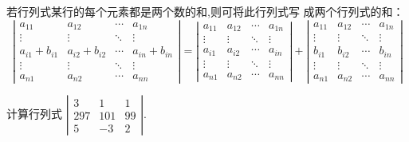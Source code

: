 \begin{property}
    若行列式某行的每个元素都是两个数的和,则可将此行列式写
    成两个行列式的和：
    \small
    $$\left|\begin{array}{ccccc}
            a_{11}        & a_{12}        & \cdots & a_{1n}        \\
            \vdots        & \vdots        & \ddots & \vdots        \\
            a_{i1}+b_{i1} & a_{i2}+b_{i2} & \cdots & a_{in}+b_{in} \\
            \vdots        & \vdots        & \ddots & \vdots        \\
            a_{n1}        & a_{n2}        & \cdots & a_{nn}
        \end{array}\right|   =   \left|\begin{array}{ccccc}
            a_{11} & a_{12} & \cdots & a_{1n} \\
            \vdots & \vdots & \ddots & \vdots \\
            a_{i1} & a_{i2} & \cdots & a_{in} \\
            \vdots & \vdots & \ddots & \vdots \\
            a_{n1} & a_{n2} & \cdots & a_{nn}
        \end{array}\right| +\left|\begin{array}{ccccc}
            a_{11} & a_{12} & \cdots & a_{1n} \\
            \vdots & \vdots & \ddots & \vdots \\
            b_{i1} & b_{i2} & \cdots & b_{in} \\
            \vdots & \vdots & \ddots & \vdots \\
            a_{n1} & a_{n2} & \cdots & a_{nn}
        \end{array}\right|   $$
\end{property}

\begin{example}
    计算行列式
    $ \left|\begin{array}{cccc}
            3   & 1   & 1  \\
            297 & 101 & 99 \\
            5   & -3  & 2
        \end{array}\right|$.
\end{example}

